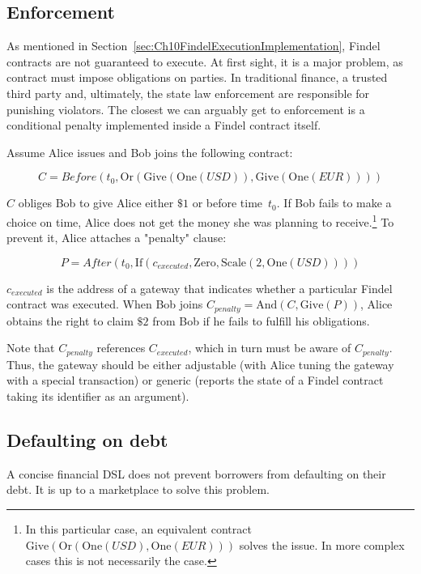 \subsection{Enforcement} \label{sec:Ch10FindelEnforcement}

As mentioned in Section~\ref{sec:Ch10FindelExecutionImplementation}, Findel contracts are not guaranteed to execute.
At first sight, it is a major problem, as contract must impose obligations on parties.
In traditional finance, a trusted third party and, ultimately, the state law enforcement are responsible for punishing violators.
The closest we can arguably get to enforcement is a conditional penalty implemented inside a Findel contract itself.

Assume Alice issues and Bob joins the following contract:

\[C=Before(t_0,\mathrm{Or}(\mathrm{Give}(\mathrm{One}(USD)),\mathrm{Give}(\mathrm{One}(EUR))))\]

\(C\) obliges Bob to give Alice either $\$1$ or  before time~$t_0$.
If Bob fails to make a choice on time, Alice does not get the money she was planning to receive.\footnote{In this particular case, an equivalent contract \(\mathrm{Give}(\mathrm{Or}(\mathrm{One}(USD),\mathrm{One}(EUR)))\) solves the issue. In more complex cases this is not necessarily the case.}
To prevent it, Alice attaches a "penalty" clause:

\[P=After(t_0,\mathrm{If}(c_{executed},\mathrm{Zero},\mathrm{Scale}(2,\mathrm{One}(USD))))\]

\(c_{executed}\) is the address of a gateway that indicates whether a particular Findel contract was executed.
When Bob joins \(C_{penalty}=\mathrm{And}(C,\mathrm{Give}(P))\), Alice obtains the right to claim $\$2$ from Bob if he fails to fulfill his obligations.

Note that \(C_{penalty}\) references \(C_{executed}\), which in turn must be aware of \(C_{penalty}\).
Thus, the gateway should be either adjustable (with Alice tuning the gateway with a special transaction) or generic (reports the state of a Findel contract taking its identifier as an argument).


\subsection{Defaulting on debt}

A concise financial DSL does not prevent borrowers from defaulting on their debt.
It is up to a marketplace to solve this problem.

